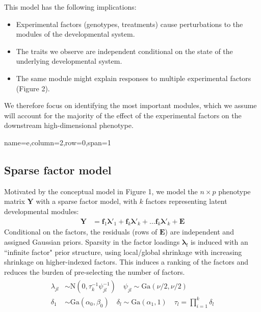 \documentclass[landscape,a0paper,fontscale=0.35]{baposter}
\begin{document}
\begin{poster}
{This model has the following implications:
\begin{itemize}
\item Experimental factors (genotypes, treatments) cause perturbations to the modules of the developmental system.
\item The traits we observe are independent conditional on the state of the underlying developmental system.
\item The same module might explain responses to multiple experimental factors (Figure 2).
\end{itemize}

We therefore focus on identifying the most important modules, which we assume will account for the majority of the effect of the experimental factors on the downstream high-dimensional phenotype. 
}
 {name=e,column=2,row=0,span=1}{
\subsection*{Sparse factor model}
Motivated by the conceptual model in Figure 1, we model the $n \times p$ phenotype matrix $\mathbf{Y}$ with a sparse factor model, with $k$ factors representing latent developmental modules:
\begin{align}
\mathbf{Y} &= \mathbf{f}_1\pmb{\lambda}'_1 + \mathbf{f}_k\pmb{\lambda}'_k + \dots \mathbf{f}_k\pmb{\lambda}'_k + \mathbf{E}
\end{align}
Conditional on the factors, the residuals (rows of $\mathbf{E}$) are independent and assigned Gaussian priors.
Sparsity in the factor loadings $\pmb{\lambda}_l$ is induced with an ``infinite factor"\citep{Bhattacharya:2011gh} prior structure, using local/global shrinkage with increasing shrinkage on higher-indexed factors. This induces a ranking of the factors and reduces the burden of pre-selecting the number of factors.
\begin{align}\begin{split}
\lambda_{jl} &\sim \mbox{N}(0,\tau^{-1}_k \psi^{-1}_{jl}) \quad \psi_{jl} \sim \mbox{Ga}(\nu/2,\nu/2) \\
\delta_1 &\sim \mbox{Ga}(\alpha_0,\beta_0)\quad \delta_l \sim \mbox{Ga}(\alpha_1,1) \quad 
\tau_l = \prod_{i=1}^k \delta_l
\end{split}\end{align}

}
\end{poster}
\end{document}
